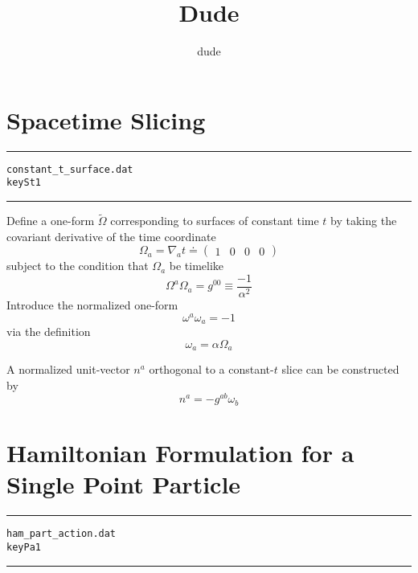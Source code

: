 \documentclass[12pt]{article}
\begin{document}
\title{Dude}
\author{dude}
\maketitle

\section{Spacetime Slicing}

\clearpage
\vspace{5mm}
\hrule
\begin{alltt}
  constant_t_surface.dat
  key St1
\end{alltt}
\hrule
\vspace{5mm}

Define a one-form $ {\tilde \Omega} $ corresponding to surfaces of constant time $t$ by
taking the covariant derivative of the time coordinate
\begin{equation}\label{St1_1}
{ \Omega } _ { a } = {\nabla}_{a} t \doteq \left( \begin{array}{cccc  } 
 1 & 0 & 0 & 0             \end{array} \right)
\end{equation}
subject to the condition that $ { \Omega } _ { a } $ be timelike
\begin{equation}\label{St1_2} \nonumber
{ \Omega } ^ { a } { \Omega } _ { a } = { g } ^ { 00 } \equiv \frac{-1}{ \alpha ^2}
\end{equation}
Introduce the normalized one-form
\begin{equation}\label{St1_3} \nonumber
{ \omega } ^ { a } { \omega } _ { a } = -1
\end{equation}
via the definition
\begin{equation}\label{St1_4} \nonumber
{ \omega } _ { a } = \alpha { \Omega } _ { a }
\end{equation}

A normalized unit-vector $ {n ^ a} $ orthogonal to a constant-$t$ slice can be
constructed by
\begin{equation}\label{St1_4} \nonumber
{n ^ a} = - {g}^{a b} { \omega } _ { b }
\end{equation}
\section{Hamiltonian Formulation for a Single Point Particle}

\clearpage
\vspace{5mm}
\hrule
\begin{alltt}
  ham_part_action.dat
  key Pa1
\end{alltt}
\hrule
\vspace{5mm}
\end{document}
